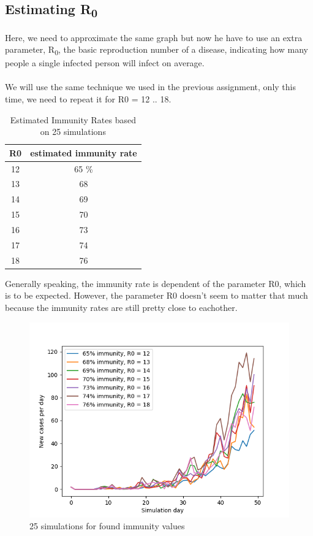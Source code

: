 \documentclass[runningheads]{llncs}
\begin{document}
\subsection{Estimating R\textsubscript{0}}
Here, we need to approximate the same graph but now he have to use an extra parameter, R\textsubscript{0}, the basic reproduction number of a disease, indicating how many people a single infected person will infect on average.
\\
\\
\noindent
We will use the same technique we used in the previous assignment, only this time, we need to repeat it for R0 = 12 .. 18.

\begin{table}
\begin{center}

	\begin{tabular}{c||c}
		R0 & estimated immunity rate \\ \hline
		12 & 65	\% \\
		13 & 68 \\
		14 & 69 \\
		15 & 70 \\
		16 & 73 \\
		17 & 74 \\
		18 & 76 \\
	\end{tabular}
	\caption{Estimated Immunity Rates based on 25 simulations}
	\end{center}

\end{table}

Generally speaking, the immunity rate is dependent of the parameter R0, which is to be expected. However, the parameter R0 doesn't seem to matter that much because the immunity rates are still pretty close to eachother.

\begin{figure}
	\includegraphics[width=\textwidth]{test_R0_final.png}
	\caption{25 simulations for found immunity values} 
\end{figure}
\end{document}
